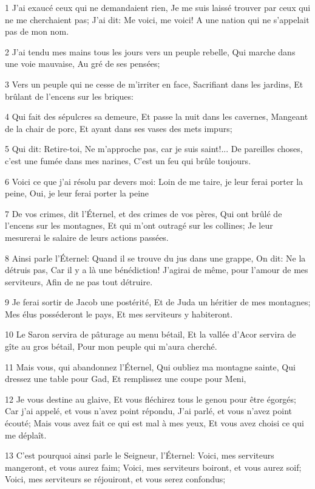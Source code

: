 \par 1 J'ai exaucé ceux qui ne demandaient rien, Je me suis laissé trouver par ceux qui ne me cherchaient pas; J'ai dit: Me voici, me voici! A une nation qui ne s'appelait pas de mon nom.
\par 2 J'ai tendu mes mains tous les jours vers un peuple rebelle, Qui marche dans une voie mauvaise, Au gré de ses pensées;
\par 3 Vers un peuple qui ne cesse de m'irriter en face, Sacrifiant dans les jardins, Et brûlant de l'encens sur les briques:
\par 4 Qui fait des sépulcres sa demeure, Et passe la nuit dans les cavernes, Mangeant de la chair de porc, Et ayant dans ses vases des mets impurs;
\par 5 Qui dit: Retire-toi, Ne m'approche pas, car je suis saint!... De pareilles choses, c'est une fumée dans mes narines, C'est un feu qui brûle toujours.
\par 6 Voici ce que j'ai résolu par devers moi: Loin de me taire, je leur ferai porter la peine, Oui, je leur ferai porter la peine
\par 7 De vos crimes, dit l'Éternel, et des crimes de vos pères, Qui ont brûlé de l'encens sur les montagnes, Et qui m'ont outragé sur les collines; Je leur mesurerai le salaire de leurs actions passées.
\par 8 Ainsi parle l'Éternel: Quand il se trouve du jus dans une grappe, On dit: Ne la détruis pas, Car il y a là une bénédiction! J'agirai de même, pour l'amour de mes serviteurs, Afin de ne pas tout détruire.
\par 9 Je ferai sortir de Jacob une postérité, Et de Juda un héritier de mes montagnes; Mes élus posséderont le pays, Et mes serviteurs y habiteront.
\par 10 Le Saron servira de pâturage au menu bétail, Et la vallée d'Acor servira de gîte au gros bétail, Pour mon peuple qui m'aura cherché.
\par 11 Mais vous, qui abandonnez l'Éternel, Qui oubliez ma montagne sainte, Qui dressez une table pour Gad, Et remplissez une coupe pour Meni,
\par 12 Je vous destine au glaive, Et vous fléchirez tous le genou pour être égorgés; Car j'ai appelé, et vous n'avez point répondu, J'ai parlé, et vous n'avez point écouté; Mais vous avez fait ce qui est mal à mes yeux, Et vous avez choisi ce qui me déplaît.
\par 13 C'est pourquoi ainsi parle le Seigneur, l'Éternel: Voici, mes serviteurs mangeront, et vous aurez faim; Voici, mes serviteurs boiront, et vous aurez soif; Voici, mes serviteurs se réjouiront, et vous serez confondus;
